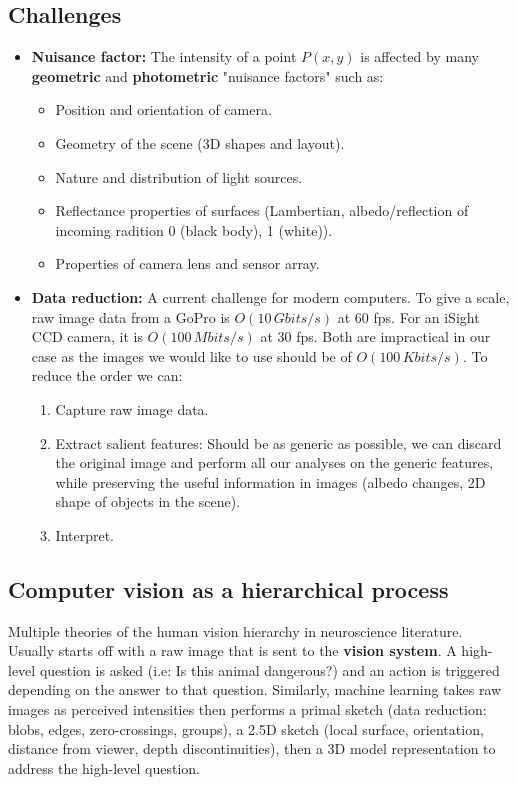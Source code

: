 \documentclass[a4paper,11pt]{article}
\begin{document}
\subsection{Challenges}
\begin{itemize}
	\item \textbf{Nuisance factor:} The intensity of a point $P(x,y)$ is affected by many \textbf{geometric} and \textbf{photometric} "nuisance factors" such as:
	\begin{itemize}
		\item Position and orientation of camera.
		\item Geometry of the scene (3D shapes and layout).
		\item Nature and distribution of light sources.
		\item Reflectance properties of surfaces (Lambertian, albedo/reflection of incoming radition 0 (black body), 1 (white)).
		\item Properties of camera lens and sensor array.
	\end{itemize}

	\item \textbf{Data reduction:} A current challenge for modern computers. To give a scale, raw image data from a GoPro is $O(10\, Gbits/s)$ at 60 fps. For an iSight CCD camera, it is $O(100\, Mbits/s)$ at 30 fps. Both are impractical in our case as the images we would like to use should be of $O(100\, Kbits/s)$. To reduce the order we can:
	\begin{enumerate}
		\item Capture raw image data.
		\item Extract salient features: Should be as generic as possible, we can discard the original image and perform all our analyses on the generic features, while preserving the useful information in images (albedo changes, 2D shape of objects in the scene).
		\item Interpret.
	\end{enumerate}
\end{itemize}
\subsection{Computer vision as a hierarchical process}
Multiple theories of the human vision hierarchy in neuroscience literature. Usually starts off with a raw image that is sent to the \textbf{vision system}. A high-level question is asked (i.e: Is this animal dangerous?) and an action is triggered depending on the answer to that question. Similarly, machine learning takes raw images as perceived intensities then performs a primal sketch (data reduction: blobs, edges, zero-crossings, groups), a 2.5D sketch (local surface, orientation, distance from viewer, depth discontinuities), then a 3D model representation to address the high-level question. 
\end{document}
